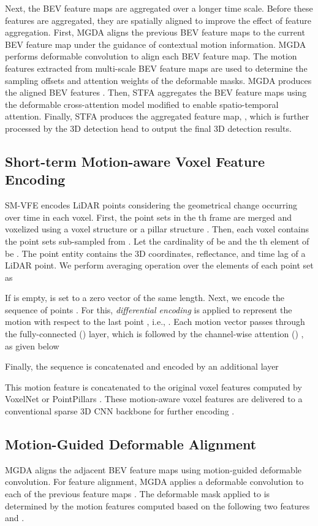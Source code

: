 \documentclass[letterpaper]{article} \usepackage{aaai23}  \usepackage{times}  \usepackage{helvet}  \usepackage{courier}  \usepackage[hyphens]{url}  \usepackage{graphicx} \urlstyle{rm} \def\UrlFont{\rm}  \usepackage{natbib}  \usepackage{caption} \frenchspacing  \setlength{\pdfpagewidth}{8.5in} \usepackage{algorithm}
\begin{document}
Next, the BEV feature maps  are aggregated over a longer time scale. Before these features are aggregated, they are spatially aligned to improve the effect of feature aggregation.  First, MGDA aligns the previous  BEV feature maps  to the current BEV feature map  under the guidance of contextual motion information. MGDA performs deformable convolution \cite{def-conv} to align each BEV feature map. The motion features extracted from multi-scale BEV feature maps are used to determine the sampling offsets and attention weights of the deformable masks. MGDA produces the aligned BEV features .
Then, STFA aggregates the  BEV feature maps  using the deformable cross-attention model modified to enable spatio-temporal attention.
Finally, STFA produces the aggregated feature map, , which is further processed by  the 3D detection head to output the final 3D detection results.

\subsection{Short-term Motion-aware Voxel Feature Encoding}
SM-VFE encodes LiDAR points considering the geometrical change occurring over time in each voxel. First, the  point sets  in the th frame are merged and voxelized using a voxel structure \cite{voxelnet} or a pillar structure \cite{pointpillars}. Then, each voxel contains the  point sets  sub-sampled from .  Let the cardinality of   be  and the th element of  be  . The point entity  contains the  3D coordinates, reflectance, and time lag of a LiDAR point. We perform averaging operation over the elements of each point set  as

If  is empty,  is set to a zero vector of the same length. 
Next, we encode the sequence of  points . For this, {\it differential encoding} is applied to represent the motion with respect to the last point , i.e., 
. Each motion vector  passes through the fully-connected () layer, which is followed by the channel-wise attention () \cite{senet}, as given below

Finally, the sequence  is concatenated and encoded by an additional  layer 

This motion feature  is concatenated to the original voxel features computed by VoxelNet \cite{voxelnet} or PointPillars \cite{pointpillars}. These motion-aware voxel features are delivered to a conventional sparse 3D CNN backbone for further encoding \cite{second}.


\subsection{Motion-Guided Deformable Alignment}
MGDA aligns the adjacent BEV feature maps  using motion-guided deformable convolution.
For feature alignment, MGDA applies a deformable convolution \cite{deformV2} to each of the previous feature maps . The deformable mask applied to  is determined by the motion features computed based on the following two features  and . 
\end{document}
